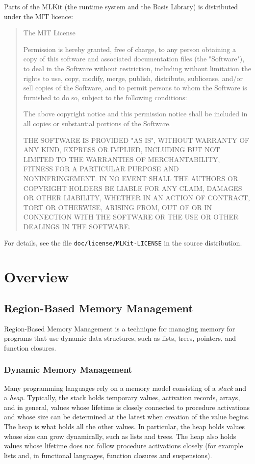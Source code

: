 \documentclass[12pt]{book}
\begin{document}
Parts of the MLKit (the runtime system and the Basis Library) is
distributed under the MIT licence:
{\sc
\begin{quote}
The MIT License

Permission is hereby granted, free of charge, to any person obtaining
a copy of this software and associated documentation files (the
"Software"), to deal in the Software without restriction, including
without limitation the rights to use, copy, modify, merge, publish,
distribute, sublicense, and/or sell copies of the Software, and to
permit persons to whom the Software is furnished to do so, subject to
the following conditions:

The above copyright notice and this permission notice shall be
included in all copies or substantial portions of the Software.

THE SOFTWARE IS PROVIDED "AS IS", WITHOUT WARRANTY OF ANY KIND,
EXPRESS OR IMPLIED, INCLUDING BUT NOT LIMITED TO THE WARRANTIES OF
MERCHANTABILITY, FITNESS FOR A PARTICULAR PURPOSE AND
NONINFRINGEMENT. IN NO EVENT SHALL THE AUTHORS OR COPYRIGHT HOLDERS BE
LIABLE FOR ANY CLAIM, DAMAGES OR OTHER LIABILITY, WHETHER IN AN ACTION
OF CONTRACT, TORT OR OTHERWISE, ARISING FROM, OUT OF OR IN CONNECTION
WITH THE SOFTWARE OR THE USE OR OTHER DEALINGS IN THE SOFTWARE.
\end{quote}
}

For details, see the file \texttt{doc/license/MLKit-LICENSE} in the
source distribution.


\part{Overview}

\chapter{Region-Based Memory Management}
\label{intro.sec}
Region-Based Memory Management is a technique for managing
memory for programs that use dynamic data structures, such as lists,
trees, pointers, and function closures.

\section{%
Dynamic Memory Management}
Many programming languages rely on a memory model consisting of a {\em
  stack}
%
and a
%
{\em heap}. Typically, the stack holds temporary values, activation
records, arrays, and in general, values whose lifetime is closely
connected to procedure activations and whose size can be determined at
the latest when creation of the value begins.  The heap is what holds
all the other values. In particular, the heap holds values whose size
can grow dynamically, such as lists and trees. The heap also holds
values whose lifetime does not follow procedure activations closely
(for example lists and, in functional languages, function closures and
suspensions).
\end{document}
